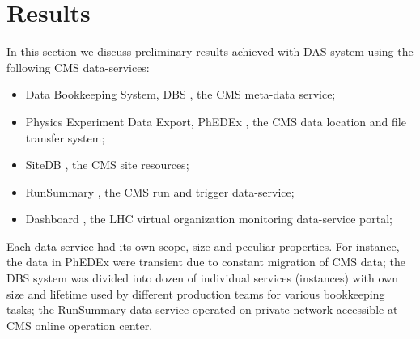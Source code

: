 \documentclass[1p,times]{elsarticle}
\begin{document}
\section{Results\label{Results}}
In this section we discuss preliminary results achieved with DAS system
using the following CMS data-services:
\begin{itemize}
\item Data Bookkeeping System, DBS \cite{DBS}, the CMS meta-data service;
\item Physics Experiment Data Export, PhEDEx \cite {PhEDEx}, the 
CMS data location and file transfer system;
\item SiteDB \cite{SiteDB}, the CMS site resources;
\item RunSummary \cite{RunSummary}, the CMS run and trigger data-service;
\item Dashboard \cite{Dashboard}, the LHC virtual organization
monitoring data-service portal;
\end{itemize}
Each data-service had its own scope, size and peculiar properties. 
For instance, the data in PhEDEx were transient due to constant 
migration of CMS data; the DBS system was divided into dozen 
of individual services (instances) with own size and lifetime 
used by different production teams for various bookkeeping tasks; 
the RunSummary data-service operated on private network accessible 
at CMS online operation center.

\end{document}
